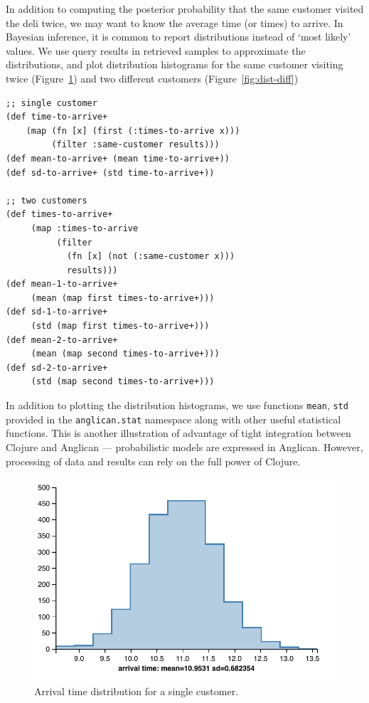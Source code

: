 \documentclass[preprint]{sigplanconf}
\begin{document}
In addition to computing the posterior probability that the same
customer visited the deli twice, we may want to know the average
time (or times) to arrive. In Bayesian inference, it is common
to report distributions instead of `most likely' values. We use
query results in retrieved samples to approximate the
distributions, and plot distribution histograms for the same
customer visiting twice (Figure~\ref{fig:dist-same}) and
two different customers (Figure~\ref{fig:dist-diff})

\begin{lstlisting}[style=default]
;; single customer                      
(def time-to-arrive+ 
    (map (fn [x] (first (:times-to-arrive x)))
         (filter :same-customer results)))
(def mean-to-arrive+ (mean time-to-arrive+))
(def sd-to-arrive+ (std time-to-arrive+))

;; two customers
(def times-to-arrive+ 
     (map :times-to-arrive 
          (filter  
            (fn [x] (not (:same-customer x)))
            results)))
(def mean-1-to-arrive+
     (mean (map first times-to-arrive+)))
(def sd-1-to-arrive+
     (std (map first times-to-arrive+)))
(def mean-2-to-arrive+
     (mean (map second times-to-arrive+)))
(def sd-2-to-arrive+
     (std (map second times-to-arrive+)))
\end{lstlisting}

In addition to plotting the distribution histograms, we use
functions \texttt{mean}, \texttt{std} provided
in the \texttt{anglican.{\linebreak[0]}stat} namespace
along with other
useful statistical functions.
This is another illustration of advantage of tight
integration between Clojure and Anglican --- probabilistic
models are expressed in Anglican. However, processing of data and
results can rely on the full power of Clojure.

\begin{figure}
    \centering
    \includegraphics[trim={12pt 0 0 0},scale=0.6]{same-customer-time.pdf}
    \caption{Arrival time distribution for a single customer.}
    \label{fig:dist-same}
\end{figure}
\end{document}
